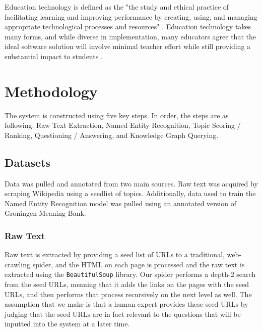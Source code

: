 \documentclass[11pt,a4paper]{article}
\begin{document}
Education technology is defined as the "the study and ethical practice of facilitating learning and improving performance by creating, using, and managing appropriate technological processes and resources" \cite{hlynka_jacobsen}. Education technology takes many forms, and while diverse in implementation, many educators agree that the ideal software solution will involve minimal teacher effort while still providing a substantial impact to students \cite{norris_soloway02/12/18}.

\section{Methodology}
The system is constructed using five key steps. In order, the steps are as following: Raw Text Extraction, Named Entity Recognition, Topic Scoring / Ranking, Questioning / Answering, and Knowledge Graph Querying. 

\subsection{Datasets}

Data was pulled and annotated from two main sources. Raw text was acquired by scraping Wikipedia using a seedlist of topics. Additionally, data used to train the Named Entity Recognition model was pulled using an annotated version of Groningen Meaning Bank. 

\subsubsection{Raw Text}\label{data_raw_text}
Raw text is extracted by providing a seed list of URLs to a traditional, web-crawling spider, and the HTML on each page is processed and the raw text is extracted using the \texttt{BeautifulSoup} library. Our spider performs a depth-2 search from the seed URLs, meaning that it adds the links on the pages with the seed URLs, and then performs that process recursively on the next level as well. The assumption that we make is that a human expert provides these seed URLs by judging that the seed URLs are in fact relevant to the questions that will be inputted into the system at a later time.
\end{document}
